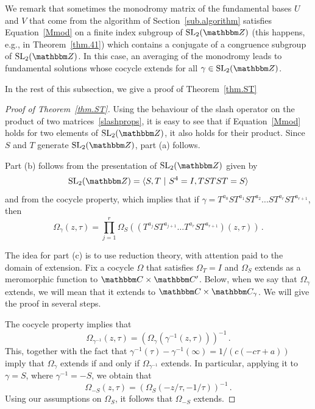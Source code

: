 \documentclass[12pt,reqno]{amsart}
\theoremstyle{definition}
\def\BZ{\mathbbm Z}
\def\BC{\mathbbm C}
\def\SL{\mathrm{SL}}
\def\be{\begin{equation}}
\def\ee{\end{equation}}
\def\Om{\Omega}
\begin{document}
We remark that sometimes the monodromy matrix of the fundamental bases $U$
and $V$ that come from the algorithm of Section~\ref{sub.algorithm}
satisfies Equation~\eqref{Mmod} on a finite index subgroup of $\SL_2(\BZ)$
(this happens, e.g., in Theorem~\ref{thm.41}) which contains a conjugate
of a congruence subgroup of $\SL_2(\BZ)$. In this case, an averaging of
the monodromy leads to fundamental solutions whose cocycle extends for all
$\gamma \in \SL_2(\BZ)$.

In the rest of this subsection, we give a proof of Theorem~\ref{thm.ST}

\begin{proof}[Proof of Theorem~\ref{thm.ST}]
  Using the behaviour of the slash operator on the product of two
  matrices~\eqref{slashprops}, it is easy to see that if Equation~\eqref{Mmod}
  holds for two elements of $\SL_2(\BZ)$, it also holds for their product. Since
  $S$ and $T$ generate $\SL_2(\BZ)$, part (a) follows.

  Part (b) follows from the presentation of $\SL_2(\BZ)$ given by
  \be
  \label{SL2Z}
  \SL_2(\BZ) = \langle S,T \,\, | \,\, S^4=I, TSTST=S \rangle
  \ee
  and from the cocycle property, which implies that
  if $\gamma=T^{a_0} S T^{a_1} S T^{a_2} \dots S T^{a_r} S T^{a_{r+1}}$, then
  \be
  \label{OmST}
  \Om_\gamma(z,\tau) = \prod_{j=1}^r
  \Om_S( (T^{a_j} S T^{a_{j+1}} \dots T^{a_r} S T^{a_{r+1}})(z,\tau))\,.
  \ee

  The idea for part (c) is to use reduction theory, with attention paid
  to the domain of extension. Fix a cocycle $\Om$ that satisfies $\Om_T=I$ and
  $\Om_S$ extends as a meromorphic function to $\BC\times\BC'$. Below, when
  we say that $\Om_\gamma$ extends, we will mean that it extends to
  $\BC \times \BC_\gamma$. We will give the proof in several steps.

  The cocycle property implies that
  \be
  \Om_{\gamma^{-1}}(z,\tau) = \left(\Om_\gamma(\gamma^{-1}(z,\tau))\right)^{-1}\,.
  \ee
  This, together with the fact that $\gamma^{-1}(\tau)-\gamma^{-1}(\infty)=
  1/(c(-c\tau+a))$ imply that $\Om_\gamma$ extends if and only if $\Om_{\gamma^{-1}}$
  extends. In particular, applying it to $\gamma=S$, where $\gamma^{-1}=-S$, we
  obtain that
  \be
  \label{Om-S}
  \Om_{-S}(z,\tau) = (\Om_S(-z/\tau,-1/\tau))^{-1} \,.
  \ee
  Using our assumptions on $\Om_S$, it follows that $\Om_{-S}$ extends. 


\end{proof}
\end{document}
